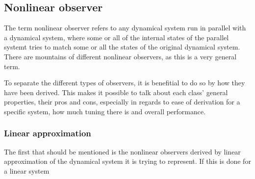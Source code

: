 \subsection{Nonlinear observer}

The term nonlinear observer refers to any dynamical system run in parallel with a dynamical system, where some or all of the internal states of the parallel systemt tries to match some or all the states of the original dynamical system. There are mountains of different nonlinear observers, as this is a very general term. 

To separate the different types of observers, it is benefitial to do so by how they have been derived. This makes it possible to talk about each class' general properties, their pros and cons, especially in regards to ease of derivation for a specific system, how much tuning there is and overall performance.

\subsubsection{Linear approximation}

The first that should be mentioned is the nonlinear observers derived by linear approximation of the dynamical system it is trying to represent\cite{LinearizingNonlinObs}. If this is done for a linear system 

